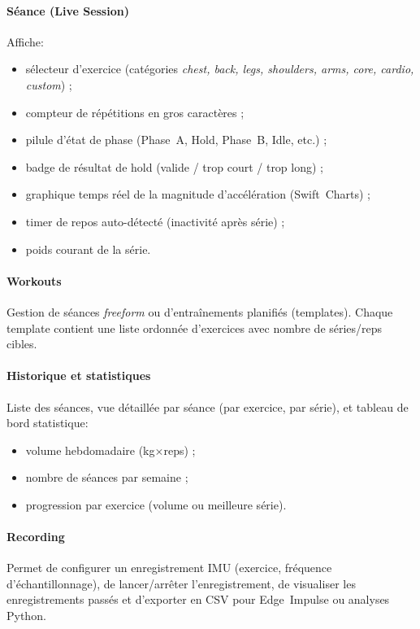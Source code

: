 \documentclass[a4paper,11pt]{article}
\begin{document}
\paragraph{Séance (Live Session)}
Affiche:
\begin{itemize}
  \item sélecteur d'exercice (catégories \emph{chest, back, legs, shoulders, arms, core, cardio, custom}) ;
  \item compteur de répétitions en gros caractères ;
  \item pilule d'état de phase (Phase~A, Hold, Phase~B, Idle, etc.) ;
  \item badge de résultat de hold (valide / trop court / trop long) ;
  \item graphique temps réel de la magnitude d'accélération (Swift~Charts) ;
  \item timer de repos auto-détecté (inactivité après série) ;
  \item poids courant de la série.
\end{itemize}

\paragraph{Workouts}
Gestion de séances \emph{freeform} ou d'entraînements planifiés (templates). Chaque template contient une liste ordonnée d'exercices avec nombre de séries/reps cibles.

\paragraph{Historique et statistiques}
Liste des séances, vue détaillée par séance (par exercice, par série), et tableau de bord statistique:
\begin{itemize}
  \item volume hebdomadaire (kg$\times$reps) ;
  \item nombre de séances par semaine ;
  \item progression par exercice (volume ou meilleure série).
\end{itemize}

\paragraph{Recording}
Permet de configurer un enregistrement IMU (exercice, fréquence d'échantillonnage), de lancer/arrêter l'enregistrement, de visualiser les enregistrements passés et d'exporter en CSV pour Edge~Impulse ou analyses Python.
\end{document}

